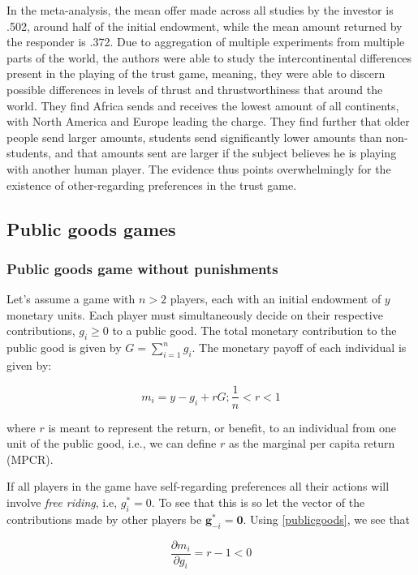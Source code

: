 \message{ !name(tese.tex)}\documentclass{article}
\begin{document}
In the meta-analysis, the mean offer made across all studies by the investor is .502, around half of the initial endowment, while the mean amount returned by the responder is .372. Due to aggregation of multiple experiments from multiple parts of the world, the authors were able to study the intercontinental differences present in the playing of the trust game, meaning, they were able to discern possible differences in levels of thrust and thrustworthiness that around the world.  They find Africa sends and receives the lowest amount of all continents, with North America and Europe leading the charge. They find further that older people send larger amounts, students send significantly lower amounts than non-students, and that amounts sent are larger if the subject believes he is playing with another human player. The evidence thus points overwhelmingly for the existence of other-regarding preferences in the trust game.
\subsection{Public goods games}
\subsubsection{Public goods game without punishments}


Let's assume a game with $n > 2$ players, each with an initial endowment of $y$ monetary units. Each player must simultaneously decide on their respective contributions, $g_i \geq 0$ to a public good. The total monetary contribution to the public good is given by $G = \sum^n_{i=1} g_i$. The monetary payoff of each individual is given by:

\begin{equation}\label{publicgoods}
    m_i = y-g_i +rG; \frac{1}{n}<r<1
\end{equation}

where $r$ is meant to represent the return, or benefit, to an individual from one unit of the public good, i.e., we can define $r$ as the marginal per capita return (MPCR).

If all players in the game have self-regarding preferences all their actions will involve \textit{free riding}, i.e, $g_i^* = 0$. To see that this is so let the vector of the contributions made by other players be $\pmb{g}_{-i}^* = \pmb{0}$. Using \eqref{publicgoods}, we see that 

\begin{equation}
\frac{\partial m_i}{\partial g_i} = r - 1 < 0
\end{equation}
\end{document}
